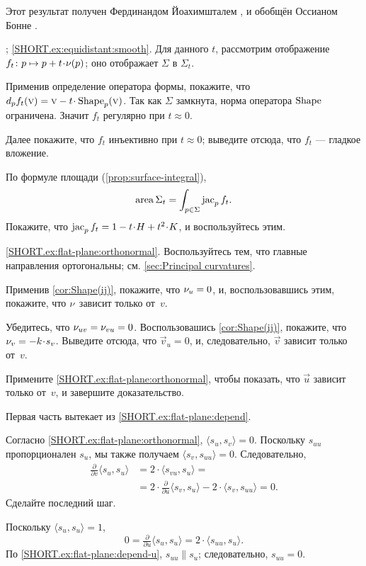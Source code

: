 \begin{multicols}{2}
Этот результат получен Фердинандом Йоахимшталем \cite{joachimsthal}, и обобщён Оссианом Бонне \cite{bonnet}.

\parbf{\ref{ex:equidistant}};
\ref{SHORT.ex:equidistant:smooth}.
Для данного $t$, рассмотрим  отображение $f_t\:p\mapsto p+t\cdot\Norm(p)$; оно отображает $\Sigma$ в $\Sigma_t$.

Применив определение оператора формы, покажите, что $d_pf_t(\vec v)=\vec v-t\cdot\Shape_p(\vec v)$.
Так как $\Sigma$ замкнута, норма оператора $\mathop{\rm Shape}\nolimits$ ограничена.
Значит $f_t$ регулярно при $t\approx 0$.

Далее покажите, что $f_t$ инъективно при $t\approx0$;
выведите отсюда, что $f_t$ --- гладкое вложение.

По формуле площади (\ref{prop:surface-integral}), 
\[\mathop{\rm area}\nolimits\Sigma_t=\int_{p\in \Sigma}\mathop{\rm jac}\nolimits_pf_t.\]
Покажите, что $\jac_pf_t=1-t\cdot H+t^2\cdot K$, и воспользуйтесь этим.

\parbf{\ref{ex:flat-plane};} \ref{SHORT.ex:flat-plane:orthonormal}.
Воспользуйтесь тем, что главные направления ортогональны; см. \ref{sec:Principal curvatures}.

Применив \ref{cor:Shape(ij)}, покажите, что $\nu_u=0$, и, воспользовавшись этим, покажите, что $\nu$ зависит только от~$v$.

Убедитесь, что $\nu_{uv}=\nu_{vu}=0$.
Воспользовашись \ref{cor:Shape(ij)}, покажите, что $\Norm_v\z=-k \cdot s_v$.
Выведите отсюда, что $\vec v_u=0$, и, следовательно, $\vec v$ зависит только от~$v$.

Примените \ref{SHORT.ex:flat-plane:orthonormal}, чтобы показать, что $\vec u$ зависит только от~$v$, и
завершите доказательство.

Первая часть вытекает из \ref{SHORT.ex:flat-plane:depend}.

Согласно \ref{SHORT.ex:flat-plane:orthonormal}, $\langle s_u,s_v\rangle=0$.
Поскольку $s_{uu}$ пропорционален $s_u$, мы также получаем $\langle s_{v},s_{uu}\rangle=0$.
Следовательно,
\begin{align*}
\tfrac{\partial}{\partial v}\langle s_u,s_u\rangle&=2\cdot \langle s_{vu},s_u\rangle=
\\
&=2\cdot \tfrac{\partial}{\partial u}\langle s_v,s_u\rangle-2\cdot \langle s_{v},s_{uu}\rangle=0.
\end{align*}
Сделайте последний шаг.

Поскольку $\langle s_u,s_u\rangle=1$,
\[0=\tfrac{\partial}{\partial u}\langle s_u,s_u\rangle=2\cdot\langle s_{uu},s_u\rangle.\]
По \ref{SHORT.ex:flat-plane:depend-u}, $s_{uu}\parallel s_u$; следовательно, $s_{uu}=0$.


\end{multicols}
